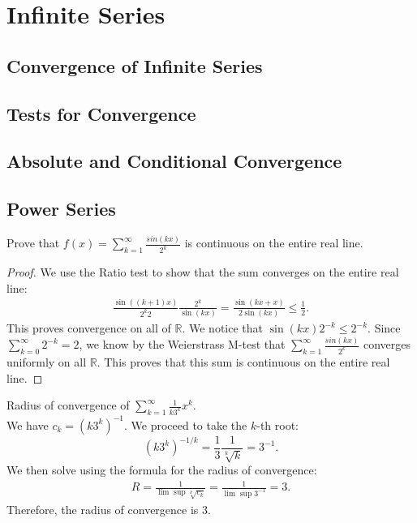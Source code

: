 \documentclass[12pt]{book}
\newcommand{\R}{\mathbb{R}}
\newenvironment{exercise}[2][Exercise]{\begin{trivlist}
\item[\hskip \labelsep {\bfseries #1}\hskip \labelsep {\bfseries #2.}]}{\end{trivlist}}
\begin{document}
\chapter{Infinite Series}

\section{Convergence of Infinite Series}


\section{Tests for Convergence}


\section{Absolute and Conditional Convergence}


\section{Power Series}


\begin{exercise}{6.4.2}
Prove that $f(x) = \sum_{k=1}^\infty \frac{sin (kx)}{2^k} $ is continuous on the entire real line.

\begin{proof}
    We use the Ratio test to show that the sum converges on the entire real line:
        \begin{align*}
        \frac{\sin\left( (k+1)x \right)}{2^k 2} \frac{2^k}{\sin(kx)} = \frac{\sin \left(kx+x\right)}{2 \sin(kx)} \leq \frac{1}{2}.
        \end{align*}
    This proves convergence on all of $\R$. We notice that $\sin(kx)2^{-k} \leq 2^{-k}$. Since $\sum_{k=0}^\infty 2^{-k} = 2$, we know by the Weierstrass M-test that $\sum_{k=1}^\infty \frac{sin (kx)}{2^k}$ converges uniformly on all $\R$. This proves that this sum is continuous on the entire real line.
\end{proof}
\end{exercise}



\begin{exercise}{6.4.4}
Radius of convergence of $\sum_{k=1}^\infty \frac{1}{k 3^k}x^k$. \\

We have $c_k = (k 3^k)^{-1}$. We proceed to take the $k$-th root:
    \[ (k 3^k)^{-1/k} = \frac{1}{3} \frac{1}{\sqrt[k]{k}} = 3^{-1}. \]
We then solve using the formula for the radius of convergence:
    \begin{align*}
    R = \frac{1}{\lim \sup \sqrt[k]{c_k}} = \frac{1}{\lim \sup 3^{-1}} = 3.
    \end{align*}
 Therefore, the radius of convergence is 3.
\end{exercise}
\end{document}
